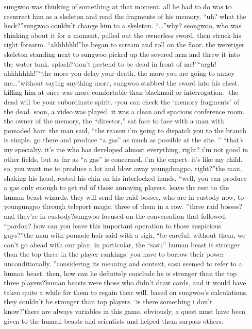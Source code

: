 sungwoo was thinking of something at that moment.
 all he had to do was to resurrect him as a skeleton and read the fragments of his memory.
“uh? what the heck?”sungwoo couldn’t change him to a skeleton.
“…”why? seongwoo, who was thinking about it for a moment, pulled out the ownerless sword, then struck his right forearm.
“ahhhhhh!”he began to scream and roll on the floor.
 the weretiger skeleton standing next to sungwoo picked up the severed arm and threw it into the water tank.
splash!“don’t pretend to be dead in front of me!”“argh! ahhhhhhh!”“the more you delay your death, the more you are going to annoy me…”without saying anything more, sungwoo stabbed the sword into his chest.
killing him at once was more comfortable than blackmail or interrogation.
-the dead will be your subordinate spirit.
-you can check the ‘memory fragments’ of the dead.
soon, a video was played.
it was a clean and spacious conference room.
 the owner of the memory, the “director,” sat face to face with a man with pomaded hair.
the man said, “the reason i’m going to dispatch you to the branch is simple.
 go there and produce “a gas” as much as possible at the site.
”
“that’s my specialty.
 it’s me who has developed almost everything, right? i’m not good in other fields, but as far as “a gas” is concerned, i’m the expert.
 it’s like my child.
 so, you want me to produce a lot and blow away youngdungpo, right?”the man, shaking his head, rested his chin on his interlocked hands, “well, you can produce a gas only enough to get rid of those annoying players.
 leave the rest to the human beast wizards.
 they will send the raid bosses, who are in custody now, to youngungpo through teleport magic.
 three of them in a row.
”three raid bosses? and they’re in custody?sungwoo focused on the conversation that followed.
“pardon? how can you leave this important operation to those suspicious guys?”the man with pomade hair said with a sigh, “be careful.
 without them, we can’t go ahead with our plan.
 in particular, the “sasu” human beast is stronger than the top three in the player rankings.
 you have to borrow their power unconditionally.
”considering its meaning and context, sasu seemed to refer to a human beast.
 then, how can he definitely conclude he is stronger than the top three players?human beasts were those who didn’t draw cards, and it would have taken quite a while for them to regain their will.
 based on sungwoo’s calculations, they couldn’t be stronger than top players.
 ‘is there something i don’t know?’there are always variables in this game.
 obviously, a quest must have been given to the human beasts and scientists and helped them surpass others.
